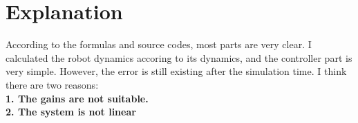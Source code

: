 \documentclass{article}
\begin{document}
\newpage
\section{Explanation}
According to the formulas and source codes, most parts are very clear.
I calculated the robot dynamics accoring to its dynamics, and the controller part is very simple.
However, the error is still existing after the simulation time. I think there are two reasons: \\
\textbf{1. The gains are not suitable.} \\
\textbf{2. The system is not linear}
\end{document}
